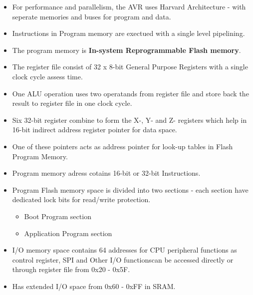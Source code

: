 \begin{itemize}
    \item For performance and parallelism, the AVR uses Harvard Architecture - with seperate memories and buses for program and data.
    \item Instructions in Program memory are exectued with a single level pipelining.
    \item The program memory is  \textbf{In-system Reprogrammable Flash memory}.
    \item The register file consist of 32 x 8-bit General Purpose Registers with a single clock cycle assess time.
    \item One ALU operation uses two operatands from register file and store back the result to register file in one clock cycle.
    \item Six 32-bit register combine to form the X-, Y- and Z- registers which help in 16-bit indirect address register pointer for data space.
    \item One of these pointers acts as address pointer for look-up tables in Flash Program Memory.
    \item Program memory adress cotains 16-bit or 32-bit Instructions.
    \item Program Flash memory space is divided into two sections - each section have dedicated lock bits for read/write protection.
    \begin{itemize}
        \item Boot Program section
        \item Application Program section
    \end{itemize}
    \item I/O memory space contains 64 addresses for CPU peripheral functions as control register, SPI and Other I/O functionscan be accessed directly or through register file from 0x20 - 0x5F.
    \item Has extended I/O space from 0x60 - 0xFF in SRAM.
\end{itemize}

